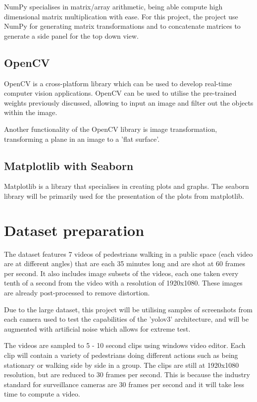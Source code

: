 \documentclass[12pt]{report}
\begin{document}
NumPy specialises in matrix/array arithmetic, being able compute high dimensional matrix multiplication with ease. For this project, the project use NumPy for generating matrix transformations and to concatenate matrices to generate a side panel for the top down view. 

\subsection{OpenCV}

OpenCV is a cross-platform library which can be used to develop real-time computer vision applications. OpenCV can be used to utilise the pre-trained weights previously discussed, allowing to input an image and filter out the objects within the image.

Another functionality of the OpenCV library is image transformation, transforming a plane in an image to a 'flat surface'.


\subsection{Matplotlib with Seaborn}

Matplotlib is a library that specialises in creating plots and graphs. The seaborn library will be primarily used for the presentation of the plots from matplotlib.

\section{Dataset preparation}

The dataset features 7 videos of pedestrians walking in a public space (each video are at different angles) that are each 35 minutes long and are shot at 60 frames per second. It also includes image subsets of the videos, each one taken every tenth of a second from the video with a resolution of 1920x1080. These images are already post-processed to remove distortion.

Due to the large dataset, this project will be utilising samples of screenshots from each camera used to test the capabilities of the 'yolov3' architecture, and will be augmented with artificial noise which allows for extreme test.

The videos are sampled to 5 - 10 second clips using windows video editor. Each clip will contain a variety of pedestrians doing different actions such as being stationary or walking side by side in a group. The clips are still at 1920x1080 resolution, but are reduced to 30 frames per second. This is because the industry standard for surveillance cameras are 30 frames per second and it will take less time to compute a video.
\end{document}
